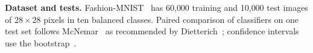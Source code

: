 \textbf{Dataset and tests.} Fashion-MNIST~\cite{xiao2017fashion} has 60{,}000 training and 10{,}000 test images
of $28\times28$ pixels in ten balanced classes. Paired comparison of classifiers on one test set follows
McNemar~\cite{mcnemar1947note} as recommended by Dietterich~\cite{dietterich1998approximate}; confidence intervals
use the bootstrap~\cite{efron1979bootstrap}.
